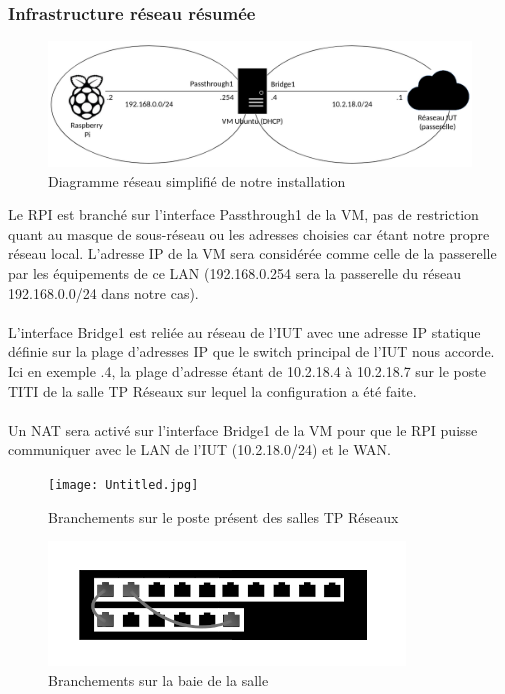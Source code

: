 \documentclass[a4paper]{article}
\begin{document}
\subsubsection{Infrastructure réseau résumée}
\label{sec:rzo}
\begin{figure}[!ht]
    \centering
    \includegraphics[scale=0.4]{rzo.png}
    \caption{Diagramme réseau simplifié de notre installation}
\label{fig:my_label}
\end{figure}
Le RPI est branché sur l'interface Passthrough1 de la VM, pas de restriction quant au masque de sous-réseau ou les adresses choisies car étant notre propre réseau local. L'adresse IP de la VM sera considérée comme celle de la passerelle par les équipements de ce LAN (192.168.0.254 sera la passerelle du réseau 192.168.0.0/24 dans notre cas).\\\\L'interface Bridge1 est reliée au réseau de l'IUT avec une adresse IP statique définie sur la plage d'adresses IP que le switch principal de l'IUT nous accorde. Ici en exemple .4, la plage d'adresse étant de 10.2.18.4 à 10.2.18.7 sur le poste TITI de la salle TP Réseaux sur lequel la configuration a été faite.\\\\Un NAT sera activé sur l'interface Bridge1 de la VM pour que le RPI puisse communiquer avec le LAN de l'IUT (10.2.18.0/24) et le WAN.
\begin{figure}[!ht]
    \centering
    \texttt{[image: Untitled.jpg]}
    \caption{Branchements sur le poste présent des salles TP Réseaux}
    \label{fig:poste}
\end{figure}
\begin{figure}[!ht]
    \centering
    \includegraphics[scale=0.9]{baie.png}
    \caption{Branchements sur la baie de la salle}
    \label{fig:baie}
\end{figure}
\newpage
\end{document}
